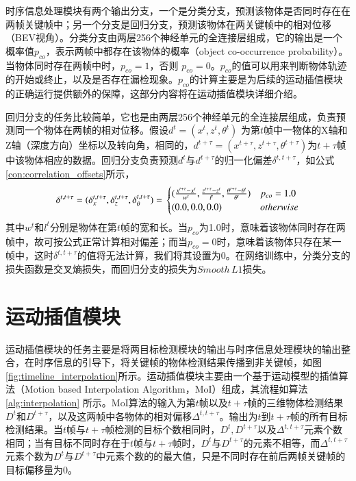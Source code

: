 时序信息处理模块有两个输出分支，一个是分类分支，预测该物体是否同时存在在两帧关键帧中；另一个分支是回归分支，预测该物体在两关键帧中的相对位移（BEV视角）。分类分支由两层256个神经单元的全连接层组成，它的输出是一个概率值$p_{co}$，表示两帧中都存在该物体的概率（object co-occurrence probability）。当物体同时存在两帧中时，$p_{co} = 1$，否则 $p_{co} = 0$。$p_{co}$的值可以用来判断物体轨迹的开始或终止，以及是否存在漏检现象。$p_{co}$的计算主要是为后续的运动插值模块的正确运行提供额外的保障，这部分内容将在运动插值模块详细介绍。

回归分支的任务比较简单，它也是由两层256个神经单元的全连接层组成，负责预测同一个物体在两帧的相对位移。假设$d^t = (x^t, z^t,\theta^t)$ 为第$t$帧中一物体的X轴和Z轴（深度方向）坐标以及转向角，相同的，$d^{t+\tau} = (x^{t+\tau}, z^{t+\tau},\theta^{t+\tau})$为$t+\tau$帧中该物体相应的数据。回归分支负责预测$d^t$与$d^{t+\tau}$的归一化偏差$\delta^{t,t+\tau}$，如公式\ref{con:correlation_offsets}所示，
\begin{equation}
\delta^{t, t+\tau} = (\delta_x^{t,t+\tau}, \delta_z^{t,t+\tau}, \delta_{\theta}^{t,t+\tau}) = \\
\begin{cases}
(\frac{x^{t+\tau} - x^{t}}{w^t}, \frac{z^{t+\tau} - z^{t}}{l^t}, \frac{\theta^{t+\tau} - \theta^{t}}{\theta^t}) & p_{co} = 1.0 \\
(0.0,0.0, 0.0) &  otherwise
\end{cases}
\label{con:correlation_offsets}
\end{equation}
其中$w^t$和$l^t$分别是物体在第$t$帧的宽和长。当$p_{co}$为1.0时，意味着该物体同时存在两帧中，故可按公式正常计算相对偏差；而当$p_{co} = 0$时，意味着该物体只存在某一帧中，这时$\delta^{t,t+\tau}$的值将无法计算，我们将其设置为0。在网络训练中，分类分支的损失函数是交叉熵损失，而回归分支的损失为$Smooth \, L1$损失。

\section{运动插值模块}
\label{interpolation}



运动插值模块的任务主要是将两目标检测模块的输出与时序信息处理模块的输出整合，在时序信息的引导下，将关键帧的物体检测结果传播到非关键帧，如图\ref{fig:timeline_interpolation}所示。运动插值模块主要由一个基于运动模型的插值算法（Motion based Interpolation Algorithm，MoI）组成，其流程如算法 \ref{alg:interpolation} 所示。MoI算法的输入为第$t$帧以及$t+\tau$帧的三维物体检测结果$D^t$和$D^{t+\tau}$，以及这两帧中各物体的相对偏移$\Delta^{t,t+\tau}$。输出为$t$到$t+\tau$帧的所有目标检测结果。当$t$帧与$t+\tau$帧检测的目标个数相同时，$D^t,D^{t+\tau}$以及$\Delta^{t,t+\tau}$元素个数相同；当有目标不同时存在于$t$帧与$t+\tau$帧时，$D^t$与$D^{t+\tau}$的元素不相等，而$\Delta^{t,t+\tau}$元素个数为$D^t$与$D^{t+\tau}$中元素个数的的最大值，只是不同时存在前后两帧关键帧的目标偏移量为0。

